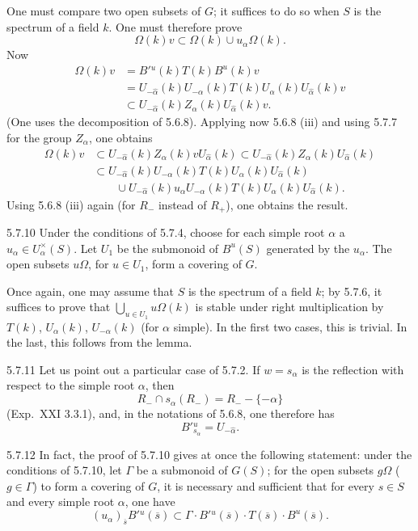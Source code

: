 One must compare two open subsets of $G$; it suffices to do so when $S$ is the spectrum of a field $k$. One must therefore prove
\[
\Omega(k)v\subset\Omega(k)\cup u_\alpha\Omega(k).
\]
Now
\[
\begin{aligned}
\Omega(k)v&=B'{}^u(k)T(k)B^u(k)v\\
&=U_{-\widehat\alpha}(k)U_{-\alpha}(k)T(k)U_\alpha(k)U_{\widehat\alpha}(k)v\\
&\subset U_{-\widehat\alpha}(k)Z_\alpha(k)U_{\widehat\alpha}(k)v.
\end{aligned}
\]
(One uses the decomposition of 5.6.8). Applying now 5.6.8 (iii) and using 5.7.7 for the group $Z_\alpha$, one obtains
\[
\begin{aligned}
\Omega(k)v&\subset U_{-\widehat\alpha}(k)Z_\alpha(k)vU_{\widehat\alpha}(k)\subset U_{-\widehat\alpha}(k)Z_\alpha(k)U_{\widehat\alpha}(k)\\
&\subset U_{-\widehat\alpha}(k)U_{-\alpha}(k)T(k)U_\alpha(k)U_{\widehat\alpha}(k)\\
&\qquad\cup U_{-\widehat\alpha}(k)u_\alpha U_{-\alpha}(k)T(k)U_\alpha(k)U_{\widehat\alpha}(k).
\end{aligned}
\]
Using 5.6.8 (iii) again (for $R_-$ instead of $R_+$), one obtains the result.
\begin{proposition}{5.7.10}\label{XXII.5.7.10}
Under the conditions of 5.7.4, choose for each simple root $\alpha$ a $u_\alpha\in U_\alpha^\times(S)$. Let $U_1$ be the submonoid of $B^u(S)$ generated by the $u_\alpha$. The open subsets $u\Omega$, for $u\in U_1$, form a covering of $G$.
\end{proposition}
Once again, one may assume that $S$ is the spectrum of a field $k$; by 5.7.6, it suffices to prove that $\bigcup_{u\in U_1}u\Omega(k)$ is stable under right multiplication by $T(k)$, $U_\alpha(k)$, $U_{-\alpha}(k)$ (for $\alpha$ simple). In the first two cases, this is trivial. In the last, this follows from the lemma.
\begin{remark}{5.7.11}\label{XXII.5.7.11}
Let us point out a particular case of 5.7.2. If $w=s_\alpha$ is the reflection with respect to the simple root $\alpha$, then
\[
R_-\cap s_\alpha(R_-)=R_--\{-\alpha\}
\]
(Exp.~XXI 3.3.1), and, in the notations of 5.6.8, one therefore has
\[
B'{}^u_{s_\alpha}=U_{-\widehat\alpha}.
\]
\end{remark}
\begin{remark}{5.7.12}\label{XXII.5.7.12}
In fact, the proof of 5.7.10 gives at once the following statement: under the conditions of 5.7.10, let $\Gamma$ be a submonoid of $G(S)$; for the open subsets $g\Omega$ ($g\in\Gamma$) to form a covering of $G$, it is necessary and sufficient that for every $s\in S$ and every simple root $\alpha$, one have
\[
(u_\alpha)_{\overline s}B'{}^u(\overline s)\subset\Gamma\cdot B'{}^u(\overline s)\cdot T(\overline s)\cdot B^u(\overline s).
\]
\end{remark}

